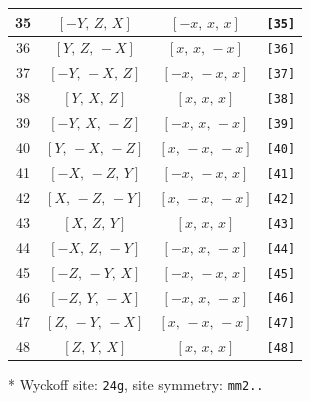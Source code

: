\documentclass[fleqn,8pt]{jsarticle}
\begin{document}
\begin{longtable}{cccc}
35 & $\left[ - Y,\, Z,\, X \right]$ & $\left[ - x,\, x,\, x \right]$ & {\tt [35]} \\ \hline
36 & $\left[ Y,\, Z,\, - X \right]$ & $\left[ x,\, x,\, - x \right]$ & {\tt [36]} \\ \hline
37 & $\left[ - Y,\, - X,\, Z \right]$ & $\left[ - x,\, - x,\, x \right]$ & {\tt [37]} \\ \hline
38 & $\left[ Y,\, X,\, Z \right]$ & $\left[ x,\, x,\, x \right]$ & {\tt [38]} \\ \hline
39 & $\left[ - Y,\, X,\, - Z \right]$ & $\left[ - x,\, x,\, - x \right]$ & {\tt [39]} \\ \hline
40 & $\left[ Y,\, - X,\, - Z \right]$ & $\left[ x,\, - x,\, - x \right]$ & {\tt [40]} \\ \hline
41 & $\left[ - X,\, - Z,\, Y \right]$ & $\left[ - x,\, - x,\, x \right]$ & {\tt [41]} \\ \hline
42 & $\left[ X,\, - Z,\, - Y \right]$ & $\left[ x,\, - x,\, - x \right]$ & {\tt [42]} \\ \hline
43 & $\left[ X,\, Z,\, Y \right]$ & $\left[ x,\, x,\, x \right]$ & {\tt [43]} \\ \hline
44 & $\left[ - X,\, Z,\, - Y \right]$ & $\left[ - x,\, x,\, - x \right]$ & {\tt [44]} \\ \hline
45 & $\left[ - Z,\, - Y,\, X \right]$ & $\left[ - x,\, - x,\, x \right]$ & {\tt [45]} \\ \hline
46 & $\left[ - Z,\, Y,\, - X \right]$ & $\left[ - x,\, x,\, - x \right]$ & {\tt [46]} \\ \hline
47 & $\left[ Z,\, - Y,\, - X \right]$ & $\left[ x,\, - x,\, - x \right]$ & {\tt [47]} \\ \hline
48 & $\left[ Z,\, Y,\, X \right]$ & $\left[ x,\, x,\, x \right]$ & {\tt [48]} \\
\end{longtable}
* Wyckoff site: {\tt 24g}, site symmetry: {\tt mm2..}
\renewcommand{\arraystretch}{1.2}
\end{document}
